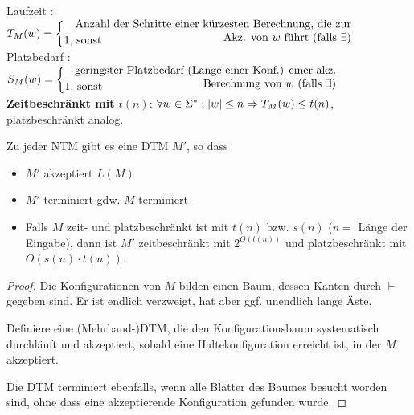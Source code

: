 {\begin{Def}[name={[Laufzeit und Platzbedarf einer \acs*{TM}]}]
	Laufzeit : $T_M(w) =
	\begin{cases}
		\parbox{.74\textwidth}{\raggedleft Anzahl der Schritte einer kürzesten Berechnung, die zur Akz. von $w$ führt (falls $\exists$)}\\[-1em]
		\text{1, sonst}
	\end{cases}
	$\\
	Platzbedarf : $S_M(w) =
	\begin{cases}
		\parbox{.7\textwidth}{\raggedleft geringster Platzbedarf (Länge einer Konf.) einer akz. Berechnung von $w$ (falls $\exists$)}\\[-1em]
		\text{1, sonst}
	\end{cases}
	$
\textbf{Zeitbeschränkt mit $t(n)$}: $\forall w\in\Sigma^*: |w|\leq n \=> T_M(w)\leq t(n)$,\\
platzbeschränkt analog.
\end{Def}
\begin{Satz}[name={[Zu jeder \acs*{NTM} gibt es \acs*{DTM}]}]\label{satz:6.1}
	Zu jeder \ac{NTM} gibt es eine \ac{DTM} $M'$, so dass
	\begin{itemize}
	\item $M'$ akzeptiert $L(M)$
	\item $M'$ terminiert gdw. $M$ terminiert
	\item Falls $M$ zeit- und platzbeschränkt ist mit $t(n)$
          bzw. $s(n)$ ($n=$ Länge der Eingabe), dann ist $M'$
          zeitbeschränkt mit $2^{O(t(n))}$ und platzbeschränkt mit
          $O(s(n)\cdot t(n))$. 
	\end{itemize}
\end{Satz}\vspace{-2em}
\begin{proof}
	Die Konfigurationen von $M$ bilden einen Baum, dessen Kanten durch $\vdash$ gegeben sind. Er ist endlich verzweigt, hat aber ggf. unendlich lange Äste.
	
	Definiere eine (Mehrband-)\ac{DTM}, die den Konfigurationsbaum
        systematisch durchläuft und akzeptiert, sobald eine
        Haltekonfiguration erreicht ist, in der $M$ akzeptiert. 
	
	Die \ac{DTM} terminiert ebenfalls, wenn alle Blätter des Baumes besucht worden sind, ohne dass eine akzeptierende Konfiguration gefunden wurde.
	

\end{proof}}
